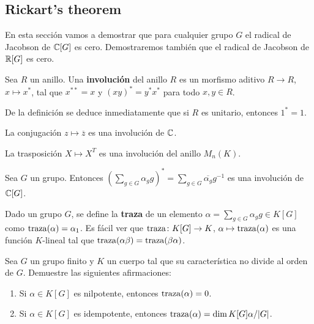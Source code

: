 \begin{exercise}
\section{Rickart's theorem}

En esta sección vamos a demostrar que para cualquier grupo $G$ el radical de
Jacobson de $\mathbb{C}[G]$ es cero. Demostraremos también que el radical de Jacobson
de $\mathbb{R}[G]$ es cero.

\begin{definition}
	Sea $R$ un anillo. Una \textbf{involución} del anillo $R$ es un morfismo
	aditivo $R\to R$, $x\mapsto x^*$, tal que $x^{**}=x$ y $(xy)^*=y^*x^*$ para
	todo $x,y\in R$.
\end{definition}

De la definición se deduce inmediatamente que si $R$ es unitario, entonces
$1^*=1$.

\begin{example}
	La conjugación $z\mapsto\overline{z}$ es una involución de $\mathbb{C}$.
\end{example}

\begin{example}
	La trasposición $X\mapsto X^T$ es una involución del
	anillo $M_n(K)$.
\end{example}

\begin{example}
	Sea $G$ un grupo. Entonces
	$\left(\sum_{g\in G}\alpha_gg\right)^*=\sum_{g\in G}\overline{\alpha_g}g^{-1}$ 
	es una involución de $\mathbb{C}[G]$.
\end{example}

Dado un grupo $G$, se define la \textbf{traza} de un elemento
$\alpha=\sum_{g\in G}\alpha_gg\in K[G]$ como $\operatorname{traza}(\alpha)=\alpha_1$. Es
fácil ver que $\operatorname{traza}\colon K[G]\to K$, $\alpha\mapsto\operatorname{traza}(\alpha)$ es una
función $K$-lineal tal que $\operatorname{traza}(\alpha\beta)=\operatorname{traza}(\beta\alpha)$.

\begin{exercise}
	Sea $G$ un grupo finito y $K$ un cuerpo tal que su característica no divide al orden de $G$.
	Demuestre las siguientes afirmaciones:
	\begin{enumerate}
		\item Si $\alpha\in K[G]$ es nilpotente, entonces $\operatorname{traza}(\alpha)=0$.
		\item Si $\alpha\in K[G]$ es idempotente, entonces $\operatorname{traza}(\alpha)=\dim
			K[G]\alpha/|G|$.
	\end{enumerate}
\end{exercise}


\end{exercise}
